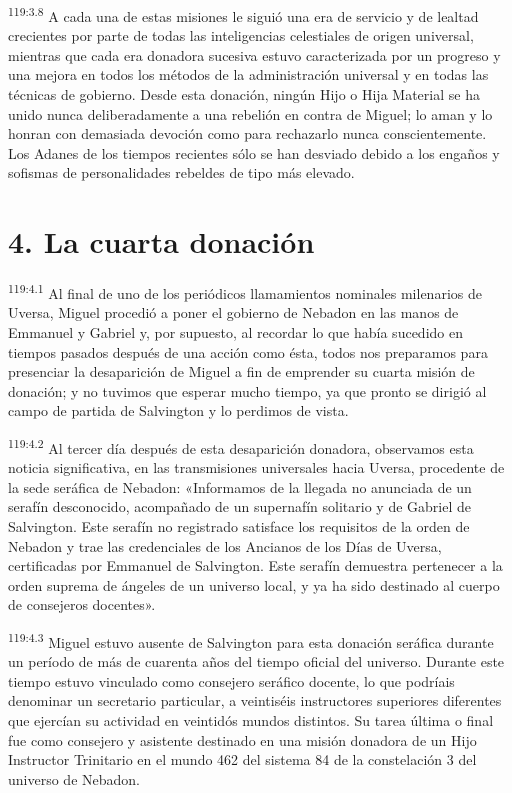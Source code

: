 \par
\textsuperscript{119:3.8} A cada una de estas misiones le siguió una era de servicio y de lealtad crecientes por parte de todas las inteligencias celestiales de origen universal, mientras que cada era donadora sucesiva estuvo caracterizada por un progreso y una mejora en todos los métodos de la administración universal y en todas las técnicas de gobierno. Desde esta donación, ningún Hijo o Hija Material se ha unido nunca deliberadamente a una rebelión en contra de Miguel; lo aman y lo honran con demasiada devoción como para rechazarlo nunca conscientemente. Los Adanes de los tiempos recientes sólo se han desviado debido a los engaños y sofismas de personalidades rebeldes de tipo más elevado.

\section*{4. La cuarta donación}
\par
\textsuperscript{119:4.1} Al final de uno de los periódicos llamamientos nominales milenarios de Uversa, Miguel procedió a poner el gobierno de Nebadon en las manos de Emmanuel y Gabriel y, por supuesto, al recordar lo que había sucedido en tiempos pasados después de una acción como ésta, todos nos preparamos para presenciar la desaparición de Miguel a fin de emprender su cuarta misión de donación; y no tuvimos que esperar mucho tiempo, ya que pronto se dirigió al campo de partida de Salvington y lo perdimos de vista.

\par
\textsuperscript{119:4.2} Al tercer día después de esta desaparición donadora, observamos esta noticia significativa, en las transmisiones universales hacia Uversa, procedente de la sede seráfica de Nebadon: «Informamos de la llegada no anunciada de un serafín desconocido, acompañado de un supernafín solitario y de Gabriel de Salvington. Este serafín no registrado satisface los requisitos de la orden de Nebadon y trae las credenciales de los Ancianos de los Días de Uversa, certificadas por Emmanuel de Salvington. Este serafín demuestra pertenecer a la orden suprema de ángeles de un universo local, y ya ha sido destinado al cuerpo de consejeros docentes».

\par
\textsuperscript{119:4.3} Miguel estuvo ausente de Salvington para esta donación seráfica durante un período de más de cuarenta años del tiempo oficial del universo. Durante este tiempo estuvo vinculado como consejero seráfico docente, lo que podríais denominar un secretario particular, a veintiséis instructores superiores diferentes que ejercían su actividad en veintidós mundos distintos. Su tarea última o final fue como consejero y asistente destinado en una misión donadora de un Hijo Instructor Trinitario en el mundo 462 del sistema 84 de la constelación 3 del universo de Nebadon.

